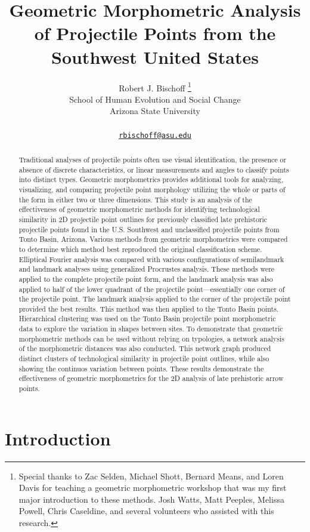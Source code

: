 \documentclass{article}
\title{Geometric Morphometric Analysis of Projectile Points from the
Southwest United States}
\author{
    Robert J. Bischoff
    \thanks{Special thanks to Zac Selden, Michael Shott, Bernard Means,
and Loren Davis for teaching a geometric morphometric workshop that was
my first major introduction to these methods. Josh Watts, Matt Peeples,
Melissa Powell, Chris Caseldine, and several volunteers who assisted
with this research.}
   \\
    School of Human Evolution and Social Change \\
    Arizona State University \\
   \\
  \texttt{\href{mailto:rbischoff@asu.edu}{\nolinkurl{rbischoff@asu.edu}}} \\
  }
\begin{document}
\maketitle


\begin{abstract}
Traditional analyses of projectile points often use visual
identification, the presence or absence of discrete characteristics, or
linear measurements and angles to classify points into distinct types.
Geometric morphometrics provides additional tools for analyzing,
visualizing, and comparing projectile point morphology utilizing the
whole or parts of the form in either two or three dimensions. This study
is an analysis of the effectiveness of geometric morphometric methods
for identifying technological similarity in 2D projectile point outlines
for previously classified late prehistoric projectile points found in
the U.S. Southwest and unclassified projectile points from Tonto Basin,
Arizona. Various methods from geometric morphometrics were compared to
determine which method best reproduced the original classification
scheme. Elliptical Fourier analysis was compared with various
configurations of semilandmark and landmark analyses using generalized
Procrustes analysis. These methods were applied to the complete
projectile point form, and the landmark analysis was also applied to
half of the lower quadrant of the projectile point---essentially one
corner of the projectile point. The landmark analysis applied to the
corner of the projectile point provided the best results. This method
was then applied to the Tonto Basin points. Hierarchical clustering was
used on the Tonto Basin projectile point morphometric data to explore
the variation in shapes between sites. To demonstrate that geometric
morphometric methods can be used without relying on typologies, a
network analysis of the morphometric distances was also conducted. This
network graph produced distinct clusters of technological similarity in
projectile point outlines, while also showing the continuos variation
between points. These results demonstrate the effectiveness of geometric
morphometrics for the 2D analysis of late prehistoric arrow points.
\end{abstract}


\hypertarget{introduction}{%
\section{Introduction}\label{introduction}}
\end{document}
